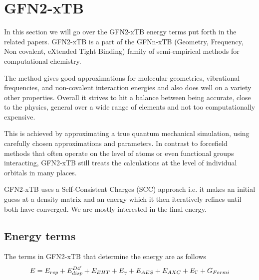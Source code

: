 \chapter{GFN2-xTB}\label{sec:gfn2}
In this section we will go over the GFN2-xTB energy terms put forth in the related papers\cite{grimme2017,bannwarth2019,bannwarth2021}.
GFN2-xTB is a part of the GFNn-xTB (Geometry, Frequency, Non covalent, eXtended Tight Binding) family of semi-empirical methods for computational chemistry. 

The method gives good approximations for molecular geometries, vibrational frequencies, and non-covalent interaction energies and also does well on a variety other properties. 
Overall it strives to hit a balance between being accurate, close to the physics, general over a wide range of elements and not too computationally expensive.

This is achieved by approximating a true quantum mechanical simulation, using carefully chosen approximations and parameters. 
In contrast to forcefield methods that often operate on the level of atoms or even functional groups interacting, GFN2-xTB still treats the calculations at the level of individual orbitals in many places. 

GFN2-xTB uses a Self-Consistent Charges (SCC) approach i.e. it makes an initial guess at a density matrix and an energy which it then iteratively refines until both have converged. We are mostly interested in the final energy. 

\section{Energy terms}
The terms in GFN2-xTB that determine the energy are as follows
\begin{equation}
E =\E{rep}+\E{disp}^{D4'}+\E{EHT}+\E{\gamma}+\E{AES}+\E{AXC}+\E{\Gamma} + G_{Fermi}
\end{equation}

